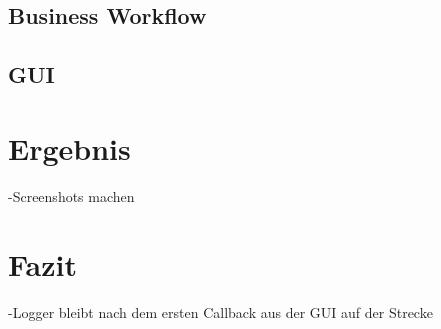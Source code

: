 \subsection{Business Workflow}

\subsection{GUI}

\section{Ergebnis}
-Screenshots machen

\section{Fazit}
-Logger bleibt nach dem ersten Callback aus der GUI auf der Strecke


\appendix


\newpage

